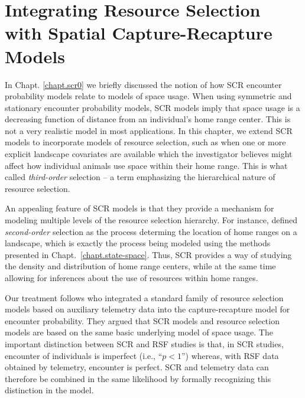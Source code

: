 \chapter{
Integrating Resource Selection
with
Spatial Capture-Recapture
Models}

\label{chapt.rsf}

\vspace{.3in}


In Chapt. \ref{chapt.scr0} we briefly discussed the notion of how
SCR encounter probability models relate to models of space usage.
When using symmetric and stationary encounter probability models, SCR
models imply that space usage is a decreasing function of distance
from an individual's home range center. This is not a very realistic
model in most applications.  In this chapter, we extend SCR
models to incorporate models of resource selection,
such as when
one or more explicit landscape covariates are available which the
investigator believes might affect how individual animals use space
within their home range. This is what \citet{johnson:1980} called {\it
  third-order} selection -- a term emphasizing the hierarchical nature
of resource selection.

An appealing feature of SCR models is that
they provide a mechanism for modeling multiple levels of the resource
selection hierarchy. For instance, \citet{johnson:1980} defined
\textit{second-order} selection as the process determing the location of
home ranges on a landscape, which is exactly the process being modeled
using the methods presented in Chapt.~\ref{chapt.state-space}. Thus,
SCR provides a way of studying the density and distribution of home
range centers, while at the
same time allowing for inferences about the use of
resources within home ranges. %


Our treatment follows
\citet{royle_etal:2012mee} who
integrated a standard family of
resource selection models based on auxiliary telemetry data into the
capture-recapture model for encounter probability.
They  argued that SCR models and resource
selection models \citep{manly_etal:2002} are based on the same basic
underlying model of space usage. The important distinction between SCR
and RSF studies is that, in SCR studies, encounter of individuals is
imperfect (i.e., ``$p<1$'') whereas, with RSF data obtained by
telemetry, encounter is perfect.
SCR and telemetry data %
can
therefore
be combined in the
same likelihood by formally recognizing this distinction in the model.

